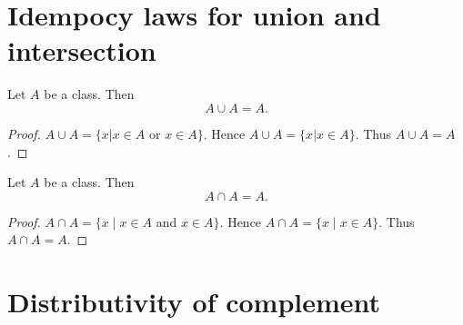 \documentclass[../set-theory.tex]{subfiles}
\begin{document}
  \section*{Idempocy laws for union and intersection}

  \begin{forthel}
    \begin{proposition}
      Let $A$ be a class.
      Then \[ A \cup A = A. \]
    \end{proposition}
    \begin{proof}
      $A \cup A = \{x | x \in A$ or $x \in A \}$.
      Hence $A \cup A = \{ x | x \in A \}$.
      Thus $A \cup A = A$.
    \end{proof}
  \end{forthel}

  \begin{forthel}
    \begin{proposition}
      Let $A$ be a class.
      Then \[ A \cap A = A. \]
    \end{proposition}
    \begin{proof}
      $A \cap A = \{ x \mid x \in A$ and $x \in A \}$.
      Hence $A \cap A = \{ x \mid x \in A \}$.
      Thus $A \cap A = A$.
    \end{proof}
  \end{forthel}


  \section*{Distributivity of complement}
\end{document}
